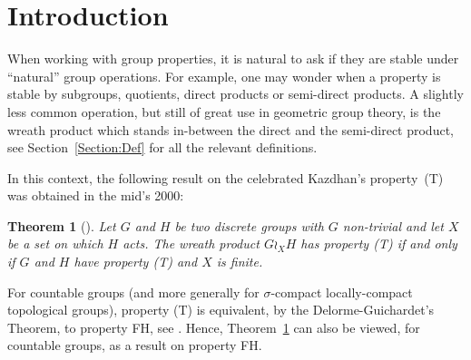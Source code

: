 \documentclass[a4paper]{article}
\newtheorem{thm}[lem]{Theorem}
\theoremstyle{definition}
\begin{document}
\section{Introduction}
%
%
%
%
%
%
When working with group properties, it is natural to ask if they are stable under ``natural'' group operations. For example, one may wonder when a property is stable by subgroups, quotients, direct products or semi-direct products.
A slightly less common operation, but still of great use in geometric group theory, is the wreath product which stands in-between the direct and the semi-direct product, see Section~\ref{Section:Def} for all the relevant definitions. %

In this context, the following result on the celebrated Kazdhan's property~(T) was obtained in the mid's 2000:
%
%
%
\begin{thm}[\cite{Cherix2004,Neuhauser2005a}] \label{T:Wreath_prop_T}
Let $G$ and $H$ be two discrete groups with $G$ non-trivial and let $X$ be a set on which $H$ acts. The wreath product $G \wr_X H$ has property (T) if and only if $G$ and $H$ have property (T) and $X$ is finite.
\end{thm}
%
%
For countable groups (and more generally for $\sigma$-compact locally-compact topological groups), property (T) is equivalent, by the Delorme-Guichardet's Theorem, to property FH, see \cite[Thm. 2.12.4]{Bekka2008}.
Hence, Theorem~\ref{T:Wreath_prop_T} can also be viewed, for countable groups, as a result on property FH.
\end{document}
